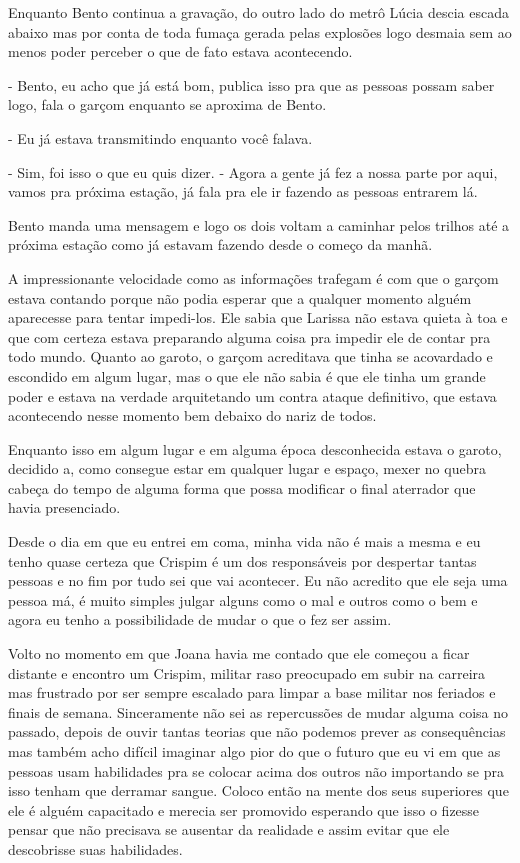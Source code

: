 Enquanto Bento continua a gravação, do outro lado do metrô Lúcia descia escada abaixo mas por conta de toda fumaça gerada pelas explosões logo desmaia sem ao menos poder perceber o que de fato estava acontecendo.

- Bento, eu acho que já está bom, publica isso pra que as pessoas possam saber logo, fala o garçom enquanto se aproxima de Bento.

- Eu já estava transmitindo enquanto você falava.

- Sim, foi isso o que eu quis dizer. - Agora a gente já fez a nossa parte por aqui, vamos pra próxima estação, já fala pra ele ir fazendo as pessoas entrarem lá.


Bento manda uma mensagem e logo os dois voltam a caminhar pelos trilhos até a próxima estação como já estavam fazendo desde o começo da manhã.

A impressionante velocidade como as informações trafegam é com que o garçom estava contando porque não podia esperar que a qualquer momento alguém aparecesse para tentar impedi-los. Ele sabia que Larissa não estava quieta à toa e que com certeza estava preparando alguma coisa pra impedir ele de contar pra todo mundo. Quanto ao garoto, o garçom acreditava que tinha se acovardado e escondido em algum lugar, mas o que ele não sabia é que ele tinha um grande poder e estava na verdade arquitetando um contra ataque definitivo, que estava acontecendo nesse momento bem debaixo do nariz de todos.

Enquanto isso em algum lugar e em alguma época desconhecida estava o garoto, decidido a, como consegue estar em qualquer lugar e espaço, mexer no quebra cabeça do tempo de alguma forma que possa modificar o final aterrador que havia presenciado.

Desde o dia em que eu entrei em coma, minha vida não é mais a mesma e eu tenho quase certeza que Crispim é um dos responsáveis por despertar tantas pessoas e no fim por tudo sei que vai acontecer. Eu não acredito que ele seja uma pessoa má, é muito simples julgar alguns como o mal e outros como o bem e agora eu tenho a possibilidade de mudar o que o fez ser assim.

Volto no momento em que Joana havia me contado que ele começou a ficar distante e encontro um Crispim, militar raso preocupado em subir na carreira mas frustrado por ser sempre escalado para limpar a base militar nos feriados e finais de semana. Sinceramente não sei as repercussões de mudar alguma coisa no passado, depois de ouvir tantas teorias que não podemos prever as consequências mas também acho difícil imaginar algo pior do que o futuro que eu vi em que as pessoas usam habilidades pra se colocar acima dos outros não importando se pra isso tenham que derramar sangue. Coloco então na mente dos seus superiores que ele é alguém capacitado e merecia ser promovido esperando que isso o fizesse pensar que não precisava se ausentar da realidade e assim evitar que ele descobrisse suas habilidades.


